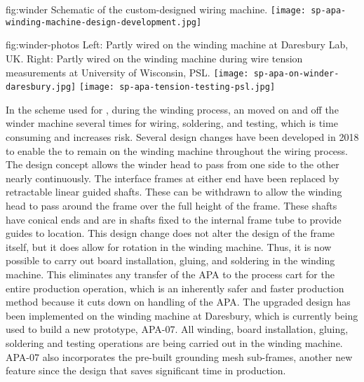 \begin{dunefigure}{fig:winder}
{Schematic of the custom-designed  wiring machine. 
}
\texttt{[image: sp-apa-winding-machine-design-development.jpg]} 
\end{dunefigure}

\begin{dunefigure}{fig:winder-photos}
{Left: Partly wired   on the winding machine at Daresbury Lab, UK. Right: Partly wired   on the winding machine during wire tension measurements at University of Wisconsin, PSL.}
\texttt{[image: sp-apa-on-winder-daresbury.jpg]}
\texttt{[image: sp-apa-tension-testing-psl.jpg]}
\end{dunefigure}

In the scheme used for , during the winding process, an  moved on and off the winder machine several times for wiring, soldering, and testing, which is time consuming and increases risk.  Several design changes have been developed in 2018 to enable the  to remain on the winding machine throughout the wiring process. The design concept allows the winder head to pass from one side to the other nearly continuously. The interface frames at either end have been replaced by retractable linear guided shafts. These can be withdrawn to allow the winding head to pass around the frame over the full height of the frame. These shafts have conical ends and are in shafts fixed to the internal frame tube to provide guides to location. This design change does not alter the design of the frame itself, but it does allow for rotation in the winding machine. Thus, it is now possible to carry out board installation, gluing, and soldering in the winding machine. This eliminates any transfer of the APA to the process cart for the entire production operation, which is an inherently safer and faster production method because it cuts down on handling of the APA.  The upgraded design has been implemented on the winding machine at Daresbury, which is currently being used to build a new prototype, APA-07. All winding, board installation, gluing, soldering and testing operations are being carried out in the winding machine. APA-07 also incorporates the pre-built grounding mesh sub-frames, another new feature since the  design that saves significant time in production.  

